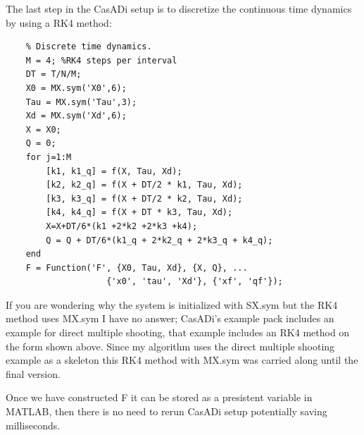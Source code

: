 The last step in the CasADi setup is to discretize the continuous time dynamics by using a \gls{RK4} method:
\begin{lstlisting}
    % Discrete time dynamics.
    M = 4; %RK4 steps per interval
    DT = T/N/M;
    X0 = MX.sym('X0',6);
    Tau = MX.sym('Tau',3);
    Xd = MX.sym('Xd',6);
    X = X0;
    Q = 0;
    for j=1:M
        [k1, k1_q] = f(X, Tau, Xd);
        [k2, k2_q] = f(X + DT/2 * k1, Tau, Xd);
        [k3, k3_q] = f(X + DT/2 * k2, Tau, Xd);
        [k4, k4_q] = f(X + DT * k3, Tau, Xd);
        X=X+DT/6*(k1 +2*k2 +2*k3 +k4);
        Q = Q + DT/6*(k1_q + 2*k2_q + 2*k3_q + k4_q);
    end
    F = Function('F', {X0, Tau, Xd}, {X, Q}, ... 
                    {'x0', 'tau', 'Xd'}, {'xf', 'qf'});
\end{lstlisting}

If you are wondering why the system is initialized with SX.sym but the RK4 method uses MX.sym I have
no answer; CasADi's example pack includes an example for direct multiple shooting, that example includes an RK4 method on the form shown above.
Since my algorithm uses the direct multiple shooting example as a skeleton this RK4 method with MX.sym was carried along until the final version.

Once we have constructed F it can be stored as a presistent variable in MATLAB, then there is no need to rerun CasADi setup potentially saving
milliseconds.


